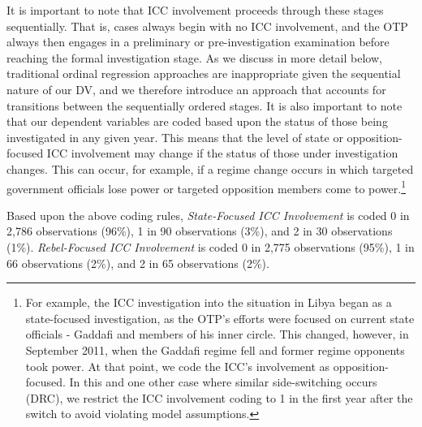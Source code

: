 It is important to note that ICC involvement proceeds through these stages sequentially. That is, cases always begin with no ICC involvement, and the OTP always then engages in a preliminary or pre-investigation examination before reaching the formal investigation stage. As we discuss in more detail below, traditional ordinal regression approaches are inappropriate given the sequential nature of our DV, and we therefore introduce an approach that accounts for transitions between the sequentially ordered stages. It is also important to note that our dependent variables are coded based upon the status of those being investigated in any given year. This means that the level of state or opposition-focused ICC involvement may change if the status of those under investigation changes. This can occur, for example, if a regime change occurs in which targeted government officials lose power or targeted opposition members come to power.\footnote{For example, the ICC investigation into the situation in Libya began as a state-focused investigation, as the OTP's efforts were focused on current state officials - Gaddafi and members of his inner circle. This changed, however, in September 2011, when the Gaddafi regime fell and former regime opponents took power. At that point, we code the ICC's involvement as opposition-focused. In this and one other case where similar side-switching occurs (DRC), we restrict the ICC involvement coding to 1 in the first year after the switch to avoid violating model assumptions.}

Based upon the above coding rules, \emph{State-Focused ICC Involvement} is coded 0 in 2,786 observations (96\%), 1 in 90 observations (3\%), and 2 in 30 observations (1\%). \emph{Rebel-Focused ICC Involvement} is coded 0 in 2,775 observations (95\%), 1 in 66 observations (2\%), and 2 in 65 observations (2\%).

